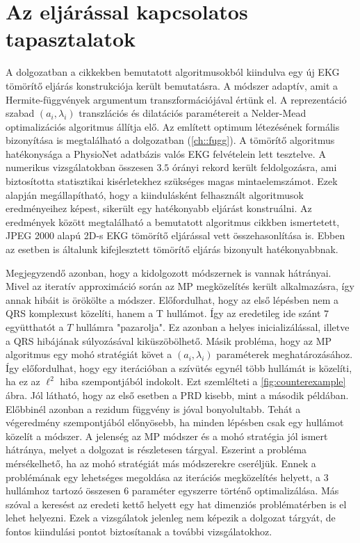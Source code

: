 \documentclass[oneside,titlepage,12pt,a4paper]{report}
\begin{document}
\section{Az eljárással kapcsolatos tapasztalatok}

A dolgozatban a \cite{kvadCikk, origCikk} cikkekben bemutatott algoritmusokból kiindulva egy új EKG tömörítő eljárás konstrukciója került bemutatásra. A módszer adaptív, amit a Hermite-függvények argumentum transzformációjával értünk el. A reprezentáció szabad $(a_i,\lambda_i)$ transzlációs és dilatációs paramétereit a Nelder-Mead optimalizációs algoritmus állítja elő. Az említett optimum létezésének formális bizonyítása is megtalálható a dolgozatban (\ref{ch::fugg}). A tömörítő algoritmus hatékonysága a PhysioNet adatbázis valós EKG felvételein lett tesztelve. A numerikus vizsgálatokban összesen $3.5$ órányi rekord került feldolgozásra, ami biztosította statisztikai kisérletekhez szükséges magas mintaelemszámot. Ezek alapján megállapítható, hogy a kiindulásként felhasznált \cite{kvadCikk, origCikk} algoritmusok eredményeihez képest, sikerült egy hatékonyabb eljárást konstruálni. Az eredmények között megtalálható a bemutatott algoritmus \cite{waveletOpt} cikkben ismertetett, JPEG 2000 alapú 2D-s EKG tömörítő eljárással vett összehasonlítása is. Ebben az esetben is általunk kifejlesztett tömörítő eljárás bizonyult hatékonyabbnak.

Megjegyzendő azonban, hogy a kidolgozott módszernek is vannak hátrányai. Mivel az iteratív approximáció során az MP megközelítés került alkalmazásra, így annak hibáit is örökölte a módszer. Előfordulhat, hogy az első lépésben nem a QRS komplexust közelíti, hanem a T hullámot. Így az eredetileg ide szánt $7$ együtthatót a $T$ hullámra "pazarolja". Ez azonban a helyes inicializálással, illetve a QRS hibájának súlyozásával kiküszöbölhető. Másik probléma, hogy az MP algoritmus egy mohó stratégiát követ a $(a_i,\lambda_i)$ paraméterek meghatározásához. Így előfordulhat, hogy egy iterációban a szívütés egynél több hullámát is közelíti, ha ez az $\ell^2$ hiba szempontjából indokolt. Ezt szemlélteti a \ref{fig:counterexample} ábra. Jól látható, hogy az első esetben a PRD kisebb, mint a második példában. Előbbinél azonban a rezidum függvény is jóval bonyolultabb. Tehát a végeredmény szempontjából előnyösebb, ha minden lépésben csak egy hullámot közelít a módszer. A jelenség az MP módszer és a mohó stratégia jól ismert hátránya, melyet a \cite{masikMatchingPursuitCikk} dolgozat is részletesen tárgyal. Eszerint a probléma mérsékelhető, ha az mohó stratégiát más módszerekre cseréljük. Ennek a problémának egy lehetséges megoldása az iterációs megközelítés helyett, a $3$ hullámhoz tartozó összesen $6$ paraméter egyszerre történő optimalizálása. Más szóval a keresést az eredeti kettő helyett egy hat dimenziós problématérben is el lehet helyezni. Ezek a vizsgálatok jelenleg nem képezik a dolgozat tárgyát, de fontos kiindulási pontot biztosítanak a további vizsgálatokhoz.
 
\end{document}
